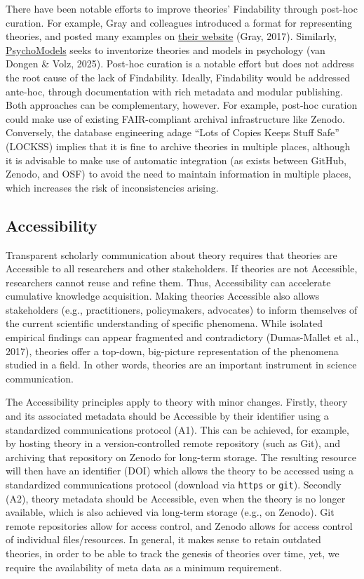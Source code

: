 \documentclass[
  man, noextraspace,floatsintext]{apa7}
\begin{document}
There have been notable efforts to improve theories' Findability through post-hoc curation.
For example, Gray and colleagues introduced a format for representing theories,
and posted many examples on \href{https://www.theorymaps.org}{their website} (Gray, 2017).
Similarly, \href{http://psychomodels.org/}{PsychoModels} seeks to inventorize theories and models in psychology (van Dongen \& Volz, 2025).
Post-hoc curation is a notable effort but does not address the root cause of the lack of Findability.
Ideally, Findability would be addressed ante-hoc, through documentation with rich metadata and modular publishing.
Both approaches can be complementary, however.
For example, post-hoc curation could make use of existing FAIR-compliant archival infrastructure like Zenodo.
Conversely, the database engineering adage ``Lots of Copies Keeps Stuff Safe'' (LOCKSS) implies that it is fine to archive theories in multiple places,
although it is advisable to make use of automatic integration (as exists between GitHub, Zenodo, and OSF) to avoid the need to maintain information in multiple places, which increases the risk of inconsistencies arising.

\subsection{Accessibility}\label{accessibility}

Transparent scholarly communication about theory requires that theories are Accessible to all researchers and other stakeholders.
If theories are not Accessible, researchers cannot reuse and refine them.
Thus, Accessibility can accelerate cumulative knowledge acquisition.
Making theories Accessible also allows stakeholders (e.g., practitioners, policymakers, advocates) to inform themselves of the current scientific understanding of specific phenomena.
While isolated empirical findings can appear fragmented and contradictory (Dumas-Mallet et al., 2017),
theories offer a top-down, big-picture representation of the phenomena studied in a field.
In other words, theories are an important instrument in science communication.

The Accessibility principles
apply to theory with minor changes.
Firstly, theory and its associated metadata should be Accessible by their identifier using a standardized communications protocol (A1).
This can be achieved, for example, by hosting theory in a version-controlled remote repository (such as Git), and archiving that repository on Zenodo for long-term storage.
The resulting resource will then have an identifier (DOI) which allows the theory to be accessed using a standardized communications protocol (download via \texttt{https} or \texttt{git}).
Secondly (A2), theory metadata should be Accessible, even when the theory is no longer available,
which is also achieved via long-term storage (e.g., on Zenodo).
Git remote repositories allow for access control,
and Zenodo allows for access control of individual files/resources.
In general, it makes sense to retain outdated theories, in order to be able to track the genesis of theories over time, yet, we require the availability of meta data as a minimum requirement.
\end{document}
